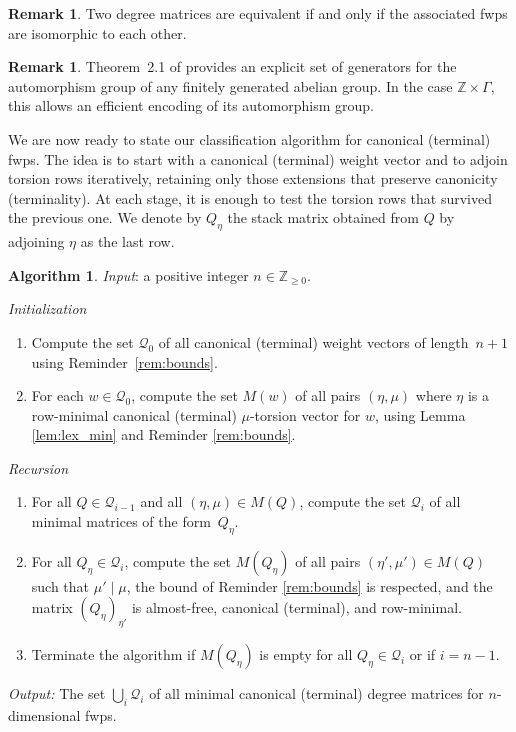 \documentclass{amsart}
\newcommand{\Z}{\mathbb{Z}}
\theoremstyle{plain}
\theoremstyle{definition}
\newtheorem{remark}[theorem]{Remark}
\newtheorem{algorithm}[theorem]{Algorithm}
\begin{document}
\begin{remark}
Two degree matrices are equivalent if and only if the associated
fwps are isomorphic to each other.
\end{remark}

\begin{remark}
Theorem~2.1 of \cite{Ghi} provides an explicit set of generators
for the automorphism group of any finitely generated abelian group.
In the case $\Z \times \Gamma$, this allows an efficient encoding
of its automorphism group.
\end{remark}


We are now ready to state our classification algorithm for canonical (terminal) fwps.
The idea is to start with a canonical (terminal) weight vector and to adjoin
torsion rows iteratively, retaining only those extensions that preserve
canonicity (terminality). At each stage, it is enough to test the torsion rows
that survived the previous one.
We denote by $Q_\eta$ the stack matrix obtained from $Q$ by adjoining $\eta$ as
the last row.



\begin{algorithm}\label{algo:classification}
\emph{Input}: a positive integer $n\in\Z_{\geq0}$.

\smallskip

\noindent\emph{Initialization}
\begin{enumerate}
\item
Compute the set $\mathcal{Q}_0$ of all canonical (terminal) weight
vectors of length~$n+1$ using Reminder~\ref{rem:bounds}.
\item
For each $w\in\mathcal{Q}_0$, compute the set $M(w)$ of all pairs
$(\eta,\mu)$ where $\eta$ is a row-minimal canonical (terminal)
$\mu$-torsion vector for $w$, using Lemma \ref{lem:lex_min}
and Reminder \ref{rem:bounds}.
\end{enumerate}
    
\noindent\emph{Recursion}
\begin{enumerate}
\item
For all $Q\in\mathcal{Q}_{i-1}$ and all $(\eta,\mu)\in M(Q)$, compute
the set $\mathcal{Q}_i$ of all minimal matrices of the form~$Q_\eta$.
\item For all $Q_\eta\in\mathcal{Q}_i$, compute the set $M(Q_\eta)$ of
all pairs $(\eta',\mu')\in M(Q)$ such that $\mu'\mid\mu$, the bound
of Reminder \ref{rem:bounds} is respected, and the matrix $(Q_\eta)_{\eta'}$
is almost-free, canonical (terminal), and row-minimal.
\item
Terminate the algorithm if $M(Q_\eta)$ is empty for all $Q_\eta\in\mathcal{Q}_i$
or if $i=n-1$.
\end{enumerate}
\noindent\emph{Output:} The set $\bigcup_i\mathcal{Q}_i$ of all minimal
canonical (terminal) degree matrices for $n$-dimensional fwps.
\end{algorithm}
\end{document}
